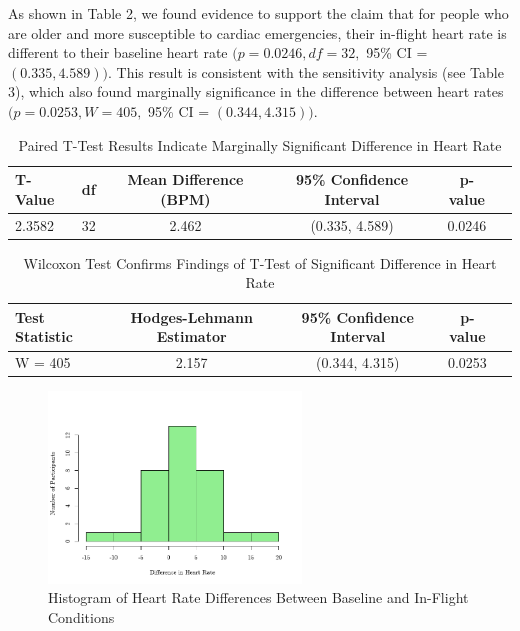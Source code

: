 \documentclass{article}
\begin{document}
\begin{enumerate}
			As shown in Table 2, we found evidence to support the claim that for people who are older and more susceptible to cardiac emergencies, their in-flight heart rate is different to their baseline heart rate $(p = 0.0246, df = 32,$ 95\% CI = $(0.335, 4.589))$. This result is consistent with the sensitivity analysis (see Table 3), which also found marginally significance in the difference between heart rates $(p = 0.0253, W = 405,$ 95\% CI = $(0.344, 4.315))$.

			\begin{table}[h!]
				\centering
				\footnotesize
				\caption{Paired T-Test Results Indicate Marginally Significant Difference in Heart Rate}
				\label{tab:t_test_results}
				\begin{tabular}{lccccc}
				\toprule
				\textbf{T-Value}  & \textbf{df} & \textbf{Mean Difference (BPM)} & \textbf{95\% Confidence Interval} & \textbf{p-value} \\
				\midrule
				2.3582      & 32          & 2.462                     & (0.335, 4.589)                    & 0.0246            \\
				\bottomrule
				\end{tabular}
			\end{table}

			\begin{table}[h!]
				\centering
				\footnotesize
				\caption{Wilcoxon Test Confirms Findings of T-Test of Significant Difference in Heart Rate}
				\label{tab:wilcoxon_results}
				\begin{tabular}{lcccc}
				\toprule
				\textbf{Test Statistic} & \textbf{Hodges-Lehmann Estimator} & \textbf{95\% Confidence Interval} & \textbf{p-value} \\
				\midrule
				W = 405                 & 2.157                           & (0.344, 4.315)                    & 0.0253            \\
				\bottomrule
				\end{tabular}
			\end{table}

			\newpage
			
			
			
			

			\begin{figure}[h!]
				\centering
				\includegraphics[width=0.6\textwidth]{HistogramCaseStudy1.png}
				\caption{Histogram of Heart Rate Differences Between Baseline and In-Flight Conditions}
				\label{fig:histogram}
			\end{figure}


\end{enumerate}
\end{document}
